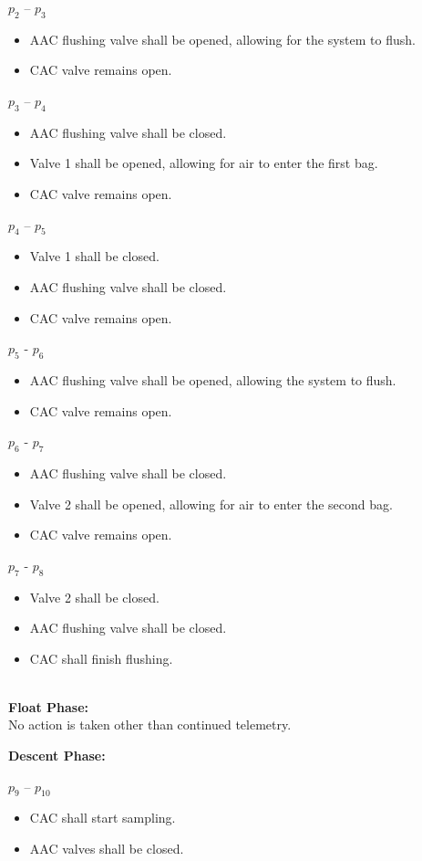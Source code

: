 \documentclass[a4paper,12pt,twoside]{article}
\begin{document}
$p_2$ – $p_3$
\begin{itemize}
    \item AAC flushing valve shall be opened, allowing for the system to flush.
    \item CAC valve remains open.
    \end{itemize}
$p_3$ – $p_4$
\begin{itemize}
    \item AAC flushing valve shall be closed.
    \item Valve 1 shall be opened, allowing for air to enter the first bag.
    \item CAC valve remains open.
    \end{itemize}
$p_4$ – $p_5$
\begin{itemize}
    \item Valve 1 shall be closed.
    \item AAC flushing valve shall be closed.
    \item CAC valve remains open.
    \end{itemize}
$p_5$ - $p_6$    
 \begin{itemize}
    \item AAC flushing valve shall be opened, allowing the system to flush. 
    \item CAC valve remains open.
    \end{itemize}
$p_6$ - $p_7$
\begin{itemize}
    \item AAC flushing valve shall be closed.
    \item Valve 2 shall be opened, allowing for air to enter the second bag.
    \item CAC valve remains open.
    \end{itemize}
$p_7$ - $p_8$
\begin{itemize}
    \item Valve 2 shall be closed.
    \item AAC flushing valve shall be closed.
    \item CAC shall finish flushing.
    \end{itemize}    




\textbf{\\Float Phase:}\\
No action is taken other than continued telemetry.

\textbf{Descent Phase:}

$p_9$ – $p_{10}$
\begin{itemize}
    \item CAC shall start sampling. 
    \item AAC valves shall be closed.
\end{itemize}
\end{document}
